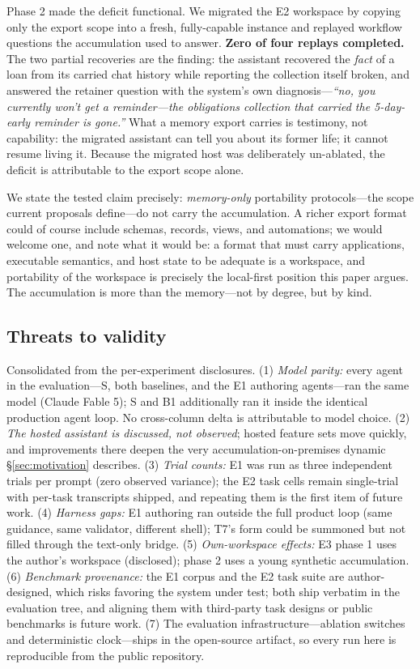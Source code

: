 \documentclass[11pt]{article}
\begin{document}
Phase 2 made the deficit functional. We migrated the E2 workspace by copying only
the export scope into a fresh, fully-capable instance and replayed workflow
questions the accumulation used to answer. \textbf{Zero of four replays
completed.} The two partial recoveries are the finding: the assistant recovered
the \emph{fact} of a loan from its carried chat history while reporting the
collection itself broken, and answered the retainer question with the system's
own diagnosis---\emph{``no, you currently won't get a reminder---the obligations
collection that carried the 5-day-early reminder is gone.''} What a memory export
carries is testimony, not capability: the migrated assistant can tell you about
its former life; it cannot resume living it. Because the migrated host was
deliberately un-ablated, the deficit is attributable to the export scope alone.

We state the tested claim precisely: \emph{memory-only} portability
protocols---the scope current proposals define---do not carry the accumulation. A
richer export format could of course include schemas, records, views, and
automations; we would welcome one, and note what it would be: a format that must
carry applications, executable semantics, and host state to be adequate is a
workspace, and portability of the workspace is precisely the local-first position
this paper argues. The accumulation is more than the memory---not by degree, but
by kind.

\subsection{Threats to validity}
\label{sec:threats}

Consolidated from the per-experiment disclosures. (1) \emph{Model parity:} every
agent in the evaluation---S, both baselines, and the E1 authoring agents---ran
the same model (Claude Fable 5); S and B1 additionally ran it inside the
identical production agent loop. No cross-column delta is attributable to model
choice. (2) \emph{The hosted assistant is discussed,
not observed}; hosted feature sets move quickly, and improvements there deepen
the very accumulation-on-premises dynamic \S\ref{sec:motivation} describes.
(3) \emph{Trial counts:} E1 was run as three independent trials per prompt (zero
observed variance); the E2 task cells remain single-trial with per-task
transcripts shipped, and repeating them is the first item of future work. (4) \emph{Harness gaps:} E1 authoring ran outside the full
product loop (same guidance, same validator, different shell); T7's form could be
summoned but not filled through the text-only bridge. (5) \emph{Own-workspace
effects:} E3 phase 1 uses the author's workspace (disclosed); phase 2 uses a
young synthetic accumulation. (6) \emph{Benchmark provenance:} the E1 corpus and
the E2 task suite are author-designed, which risks favoring the system under
test; both ship verbatim in the evaluation tree, and aligning them with
third-party task designs or public benchmarks is future work. (7) The evaluation
infrastructure---ablation switches and deterministic clock---ships in the
open-source artifact, so every run here is reproducible from the public
repository.
\end{document}
